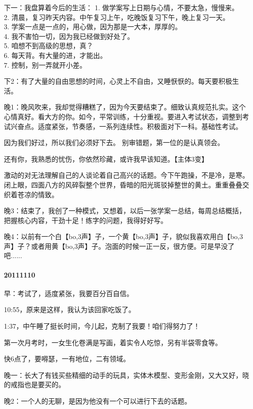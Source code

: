 \documentclass[UTF8]{book}
\begin{document}
下一：我盘算着今后的生活：
1. 做学案写上日期与心情，不要太急，慢慢来。\\
2. 清晨，复习昨天内容。中午复习上午，吃晚饭复习下午，晚上复习一天。\\
3. 学案一点是一点的，用心做，因为那是一大本，厚厚的。\\
4. 我不害怕一切，因为我已经做到好处了。\\
5. 咱想不到高级的思想，真？\\
6. 每天背。有大量的进，才能出。\\
7. 控制，别一弄就开小差。

下2：有了大量的自由思想的时间，心灵上不自由，又睡恹恹的。每天要积极生活。

晚1：晚风吹来，我却觉得糟糕了，因为今天要结束了。细致认真规范扎实。这个心情真好。看大方的你。如今，平常训练，十分重视。要进入考试状态，调整到考试兴奋点。适度紧张，节奏感，一系列连续性。积极面对下一科。基础性考试。

因为我们好过，所以我们必须好下去。
别审错题，第一位的是认真领会。

还有你，我熟悉的忧伤，你依然珍藏，或许我早该知道。【主体3变】

激动的对无法理解自己的人谈论着自己高兴的话题。今下午跑操，不是冷，是寒。闭上眼，四面八方的风碎裂整个世界，昏暗的阳光斑驳掉整世的黄土。重重叠叠交织着苍凉的情致。

晚3：结束了，我创了一种模式，又想着，以后一张学案一总结，每周总结概括，把握核心内容，干劲十足！练字的问题，我得好好写。

晚4：以前有一个白【bo,3声】子，一个黄【bo,3声】子，貌似我喜欢用白【bo,3声】子？或者用黄【bo,3声】子。泡面的时候一正一反，很方便。可是早没了吧......


\paragraph{20111110}

早：考试了，适度紧张，我要百分百自信。

10:55，原来是这样，我认为该回家吃饭了。

1:37，中午睡了挺长时间，今儿起，克制了我要！咱们得努力了！

第一次月考时，一女生化卷满是写画，着实令人吃惊，另有半袋零食等。

快6点了，要嘚瑟，一有地位，二有领域。

晚一：长大了有钱买些精细的动手的玩具，实体木模型、变形金刚，又大又好，晓的戒指也是要买的。

晚2：一个人的无聊，是因为他没有一个可以进行下去的话题。
\end{document}

